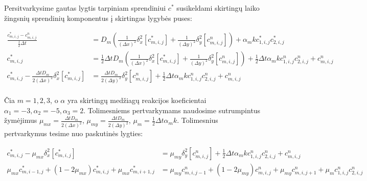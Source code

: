 Persitvarkysime gautas lygtis tarpiniam sprendiniui $c^*$ susikeldami skirtingų laiko žingsnių sprendinių komponentus į skirtingas lygybės puses:

\begin{align*}
  \frac{c^{*}_{m,i,j} - c^n_{m,i,j}}{\frac{1}{2}\Delta t} 
  &= D_m \left( \frac{1}{(\Delta x)^2}\delta_x^2[c^{*}_{m,i,j}] 
  + \frac{1}{(\Delta y)^2}\delta_y^2[c^n_{m,i,j}] \right) 
  + \alpha_mkc^*_{1,i,j}c^*_{2,i,j} \\
  c^*_{m,i,j} 
  &= \frac{1}{2}\Delta t D_m \left( \frac{1}{(\Delta x)^2}\delta_x^2[c^{*}_{m,i,j}] 
  + \frac{1}{(\Delta y)^2}\delta_y^2[c^n_{m,i,j}] \right)
  + \frac{1}{2}\Delta t \alpha_m kc^n_{1,i,j}c^n_{2,i,j} + c^n_{m,i,j}\\
  c^*_{m,i,j} - \frac{\Delta t D_m}{2(\Delta x)^2}\delta_x^2[c^{*}_{m,i,j}] 
  &= \frac{\Delta t D_m}{2(\Delta y)^2}\delta_y^2[c^n_{m,i,j}]
  + \frac{1}{2}\Delta t \alpha_m kc^n_{1,i,j}c^n_{2,i,j} + c^n_{m,i,j}\\
\end{align*}

Čia $m = 1, 2, 3$,  o $\alpha$ yra skirtingų medžiagų reakcijos koeficientai $\alpha_1 = -3, \alpha_2 = -5, \alpha_3 = 2$. Tolimesniems pertvarkymams naudosime sutrumpintus žymėjimus $\mu_{mx} = \frac{\Delta t D_m}{2(\Delta x)^2}$, $\mu_{my} = \frac{\Delta t D_m}{2(\Delta y)^2}$, $\mu_m = \frac{1}{2}\Delta t \alpha_m k$. Tolimesnius pertvarkymus tesime nuo paskutinės lygties:

\begin{align*}
	c^*_{m,i,j} - \mu_{mx}\delta_x^2[c^{*}_{m,i,j}]
	&= \mu_{my}\delta_y^2[c^n_{m,i,j}] + \frac{1}{2}\Delta t \alpha_m kc^n_{1,i,j}c^n_{2,i,j} + c^n_{m,i,j}\\
	\mu_{mx}c^{*}_{m,i-1,j}+(1-2\mu_{mx})c^{*}_{m,i,j}+\mu_{mx}c^{*}_{m,i+1,j}
	&= \mu_{my}c^n_{m,i,j-1}+(1-2\mu_{my})c^n_{m,i,j}+\mu_{my}c^n_{m,i,j+1}+\mu_m c^n_{1,i,j}c^n_{2,i,j}
\end{align*}
